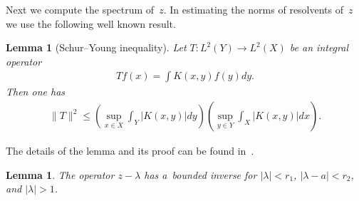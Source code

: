\documentclass[pdftex]{sigma}
\numberwithin{equation}{section}
\newtheorem{Lemma}[Theorem]{Lemma}
\begin{document}
Next we compute the spectrum of~$z$.
In estimating the norms of resolvents of~$z$ we use the following well known result.

\begin{Lemma}[Schur--Young inequality]
\label{schuryounginq}
Let $T: L^2(Y) \longrightarrow L^2(X)$ be an integral operator
\begin{gather*}
Tf(x)=\int K(x,y)f(y)dy.
\end{gather*}
Then one has
\begin{gather*}
\|T\|^2 \le \left(\sup_{x\in X} \int_Y |K(x,y)|dy\right)\left(\sup_{y\in Y} \int_X |K(x,y)|dx\right).
\end{gather*}
\end{Lemma}

The details of the lemma and its proof can be found in~\cite{HS}.

\begin{Lemma}
\label{resolvent_of_z}
The operator $z-\lambda$ has a~bounded inverse for $|\lambda|< r_1$, $|\lambda-a|< r_2$, and $|\lambda|>1$.
\end{Lemma}
\end{document}
